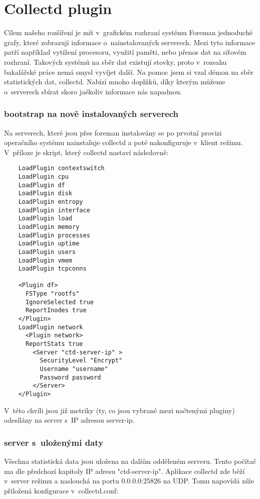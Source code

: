 
\section{Collectd plugin}

Cílem našeho rozšíření je mít v~grafickém rozhraní systému Foreman jednoduché grafy, které zobrazují informace o~nainstalovaných serverech. Mezi tyto informace patří například vytížení procesoru, využití paměti, nebo přenos dat na síťovém rozhraní. Takových systémů na sběr dat existují stovky, proto v~rozsahu bakalářské práce nemá smysl vyvíjet další. Na pomoc jsem si vzal démon na sběr statistických dat, collectd. Nabízí mnoho doplňků, díky kterým můžeme o~serverech sbírat skoro jaékoliv informace nás napadnou.

\subsubsection{bootstrap na nově instalovaných serverech}

Na serverech, které jsou přes foreman instalovány se po prvotní provizi operačního systému nainstaluje collectd a poté nakonfiguruje v~klient režimu. V~příloze je skript, který collectd nastaví následovně:

\begin{verbatim}
	LoadPlugin contextswitch
	LoadPlugin cpu
	LoadPlugin df
	LoadPlugin disk
	LoadPlugin entropy
	LoadPlugin interface
	LoadPlugin load
	LoadPlugin memory
	LoadPlugin processes
	LoadPlugin uptime
	LoadPlugin users
	LoadPlugin vmem
	LoadPlugin tcpconns

	<Plugin df>
	  FSType "rootfs"
	  IgnoreSelected true
	  ReportInodes true
	</Plugin>
	LoadPlugin network
	  <Plugin network>
	  ReportStats true
	    <Server "ctd-server-ip" >
	      SecurityLevel "Encrypt"
	      Username "username"
	      Password password
	    </Server>
	</Plugin>
\end{verbatim}

V~této chvíli jsou již metriky (ty, co jsou vybrané mezi načtenými pluginy) odesílány na server s~IP adresou server-ip.



\subsubsection{server s~uloženými daty}

Všechna statistická data jsou uložena na dalším odděleném serveru. Tento počítač ma dle předchozí kapitoly IP adresu "ctd-server-ip". Aplikace collectd zde běží v~server režimu a naslouchá na portu 0.0.0.0:25826 na UDP. Tomu napovídá níže přiložená konfigurace v~collectd.conf:

